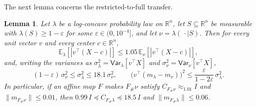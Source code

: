 \documentclass[11pt]{article}
\numberwithin{equation}{section}
\newtheorem{lemma}{Lemma}[section]
\theoremstyle{definition}
\newcommand{\eps}{\varepsilon}
\newcommand{\R}{\mathbb{R}}
\newcommand{\E}[2]{\mathbb{E}_{#1}\left[#2\right]}
\newcommand{\V}[2]{\mathsf{Var}_{#1}\left[#2\right]}
\begin{document}
The next lemma concerns the restricted-to-full transfer.

\begin{lemma}
\label{lem:transfer}
Let $\lambda$ be a log-concave probability law on
$\R^n$, let
$S\subseteq\R^n$ be measurable with
$\lambda(S)\geq1-\eps$ for some
$\eps\in(0,10^{-4}]$, and let
$\nu=\lambda(\,\cdot\mid S)$.
Then for every unit vector $v$ and every center
$c\in\R^n$,
\[
 \E{\lambda}{|v^\top(X-c)|}
 \leq1.05\,\E{\nu}{|v^\top(X-c)|},
\]
and, writing the variances as $\sigma_\lambda^2=\V{\lambda}{v^\top X}$ and
$\sigma_\nu^2=\V{\nu}{v^\top X}$,
\[
(1-\eps)\,\sigma_\nu^2
\leq\sigma_\lambda^2
\leq18.1\,\sigma_\nu^2 ,
\qquad
\bigl(v^\top(m_\lambda-m_\nu)\bigr)^2 \leq\frac{\eps}{1-2\eps}\,\sigma_\lambda^2 .
\]
In particular, if an affine map $F$ makes
$F_\#\nu$ satisfy
$C_{F_\#\nu}\approx_{1.01}I$ and
$\|m_{F_\#\nu}\|\leq0.01$, then
$0.99\,I\preceq C_{F_\#\lambda}\preceq18.5\,I$ and
$\|m_{F_\#\lambda}\|\leq0.06$.
\end{lemma}
\end{document}
